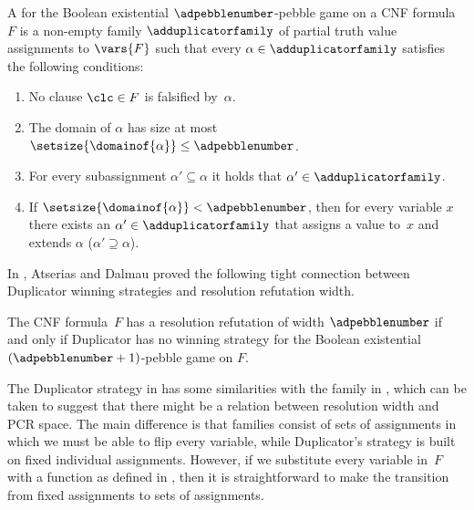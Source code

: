 \begin{definition}
  \label{def:AD-game}  
%
%
%
%
%
%
%
%
  A
  for the Boolean existential $\adpebblenumber$-pebble game on 
  a CNF formula~$F$ is a non-empty family $\adduplicatorfamily$ of
  partial truth value assignments 
%
  to $\vars{F}$
  such that every 
  $\alpha \in \adduplicatorfamily$ 
  satisfies the following conditions:
  \begin{enumerate}
  \item
    No clause $\clc \in F$ is falsified by~$\alpha$.
  \item
    The domain of $\alpha$ has size at most
    $\setsize{\domainof{\alpha}} \leq \adpebblenumber$.
  \item 
    For every 
    subassignment
    $\alpha' \subseteq \alpha$ 
    it holds that
    $\alpha' \in \adduplicatorfamily$.
%
%
%
%
  \item 
    If $\setsize{\domainof{\alpha}} < \adpebblenumber$, then for every
    variable $x$ there exists an $\alpha' \in \adduplicatorfamily$ 
    that assigns a value to~$x$
    and extends $\alpha$ 
    (\ieComma $\alpha' \supseteq \alpha$).
%
%
%
%
  \end{enumerate}
\end{definition}

In \cite{AD08CombinatoricalCharacterization}, Atserias and Dalmau
proved the following tight connection between Duplicator winning strategies 
and resolution refutation width.
%
%

\begin{theorem}
  \label{th:ADWidthCharacterization}
%
%
%
  The CNF formula~$F$ has a resolution refutation of width
  $\adpebblenumber$ if and only if Duplicator has no winning strategy
  for the Boolean existential $(\adpebblenumber + 1)$-pebble game on $F$.
\end{theorem}

%
%
%
%
%
%
%
%
%
%
%
%
%
%
%
%

The Duplicator strategy in  has some similarities
with the \kextendibleNok{} family in , which
can be taken to suggest that there might be a relation between
resolution width and PCR space. The main difference is that
\kextendibleNok families consist of sets of assignments in
which we must be able to flip every variable, while Duplicator's
strategy is built on fixed individual assignments. However,
if we substitute every variable in~$F$ with a \nonauthor{} function as
defined in , then it is straightforward to
make the transition from fixed assignments to sets of \flippable assignments.
%
%
%
%
%
%
%


